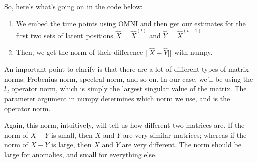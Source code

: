 \documentclass[letterpaper,10pt,english]{jupyterBook}
\begin{document}
\sphinxAtStartPar
So, here’s what’s going on in the code below:
\begin{enumerate}
%
\item {} 
\sphinxAtStartPar
We embed the time points using OMNI and then get our estimates for the first two sets of latent positions \(\hat{X} = \hat{X}^{(t)}\) and \(\hat{Y} = \hat{X}^{(t-1)}\).

\item {} 
\sphinxAtStartPar
Then, we get the norm of their difference \(||\hat{X} - \hat{Y}||\) with numpy.

\end{enumerate}

\sphinxAtStartPar
An important point to clarify is that there are a lot of different types of matrix norms: Frobenius norm, spectral norm, and so on. In our case, we’ll be using the \(l_2\) operator norm, which is simply the largest singular value of the matrix. The  parameter argument in numpy determines which norm we use, and  is the operator norm.

\sphinxAtStartPar
Again, this norm, intuitively, will tell us how different two matrices are. If the norm of \(X - Y\) is small, then \(X\) and \(Y\) are very similar matrices; whereas if the norm of \(X - Y\) is large, then \(X\) and \(Y\) are very different. The norm should be large for anomalies, and small for everything else.

\begin{sphinxVerbatim}[commandchars=\\\{\}]
     

  
      
      
       \PYG{p}{[}\PYG{p}{]} \PYG{p}{[}\PYG{p}{]}
         
     
          
         

    
\end{sphinxVerbatim}
\end{document}

